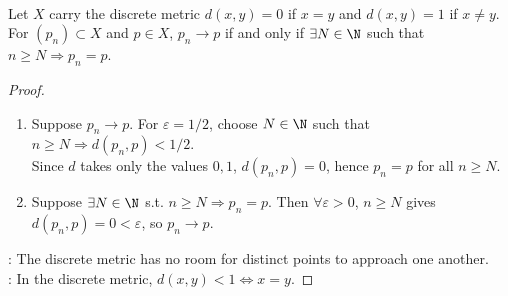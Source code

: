 \begin{proposition} \label{prop:discrete-metric-convergence-eventually-constant} \\
Let $X$ carry the discrete metric $d(x,y)=0$ if $x=y$ and $d(x,y)=1$ if $x\neq y$.\\
For $(p_n)\subset X$ and $p\in X$, $p_n\to p$ if and only if $\exists N\in\N$ such that $n\geq N\Longrightarrow p_n=p$.
\begin{proof}
\begin{enumerate}[label=\roman*.]
\setlength{\itemsep}{0pt}
\item[$(\Rightarrow)$] Suppose $p_n\to p$. For $\varepsilon=1/2$, choose $N\in\N$ such that $n\geq N\Longrightarrow d(p_n,p)<1/2$.\\
Since $d$ takes only the values $0,1$, $d(p_n,p)=0$, hence $p_n=p$ for all $n\geq N$.
\item[$(\Leftarrow)$] Suppose $\exists N\in\N$ s.t. $n\geq N\Longrightarrow p_n=p$. Then $\forall \varepsilon>0$, $n\geq N$ gives $d(p_n,p)=0<\varepsilon$, so $p_n\to p$.
\end{enumerate}
: The discrete metric has no room for distinct points to approach one another.\\
: In the discrete metric, $d(x,y)<1\Longleftrightarrow x=y$.
\end{proof}
\end{proposition}


